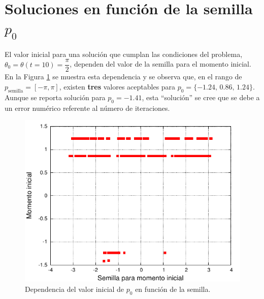 \documentclass[10pt,letterpaper]{article}
\begin{document}
\section{Soluciones en función de la semilla $p_0$}
El valor inicial para una solución que cumplan las condiciones del problema, $\theta_0 = \theta(t=10) = \dfrac{\pi}{2}$, dependen del valor de la semilla para el momento inicial. En la Figura \ref{Fig-Semilla} se muestra esta dependencia y se observa que, en el rango de $p_{\text{semilla}} = [-\pi, \pi]$, existen \textbf{tres} valores aceptables para $p_0 = \{-1.24,\, 0.86, \,1.24\}$. Aunque se reporta solución para $p_0 = -1.41$, esta ``solución'' se cree que se debe a un error numérico referente al número de iteraciones.
\begin{figure}
\centering
\includegraphics[scale=1]{Grafica_P0.pdf}
\caption{Dependencia del valor inicial de $p_0$ en función de la semilla.}\label{Fig-Semilla}
\end{figure}
\end{document}
